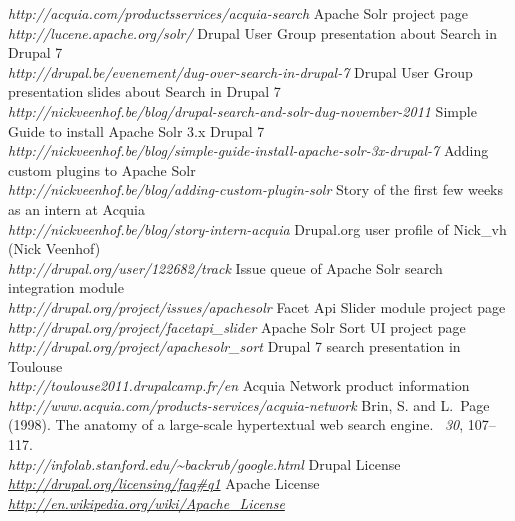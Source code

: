 \begin{thebibliography}{99}
		\emph{http://acquia.com/productsservices/acquia-search}
		Apache Solr project page\\
		\emph{http://lucene.apache.org/solr/}
		Drupal User Group presentation about Search in Drupal 7\\
		\emph{http://drupal.be/evenement/dug-over-search-in-drupal-7}
		Drupal User Group presentation slides about Search in Drupal 7\\
		\emph{http://nickveenhof.be/blog/drupal-search-and-solr-dug-november-2011}
		Simple Guide to install Apache Solr 3.x Drupal 7\\
		\emph{http://nickveenhof.be/blog/simple-guide-install-apache-solr-3x-drupal-7}
		Adding custom plugins to Apache Solr\\
		\emph{http://nickveenhof.be/blog/adding-custom-plugin-solr}
		Story of the first few weeks as an intern at Acquia\\
		\emph{http://nickveenhof.be/blog/story-intern-acquia}
		Drupal.org user profile of Nick\_vh (Nick Veenhof)\\
		\emph{http://drupal.org/user/122682/track}
		Issue queue of Apache Solr search integration module\\
		\emph{http://drupal.org/project/issues/apachesolr}
		Facet Api Slider module project page\\
		\emph{http://drupal.org/project/facetapi\_slider}
		Apache Solr Sort UI project page\\
		\emph{http://drupal.org/project/apachesolr\_sort}
		Drupal 7 search presentation in Toulouse\\
		\emph{http://toulouse2011.drupalcamp.fr/en}
		Acquia Network product information\\
		\emph{http://www.acquia.com/products-services/acquia-network}
		Brin, S. and L.~Page (1998).
		\newblock The anatomy of a large-scale hypertextual web search engine.
		~{\em 30}, 107--117.\\
		\emph{http://infolab.stanford.edu/\textasciitilde backrub/google.html}
		Drupal License\\
		\emph{\url{http://drupal.org/licensing/faq\#q1}}
		Apache License\\
		\emph{\url{http://en.wikipedia.org/wiki/Apache_License}}

\end{thebibliography}

